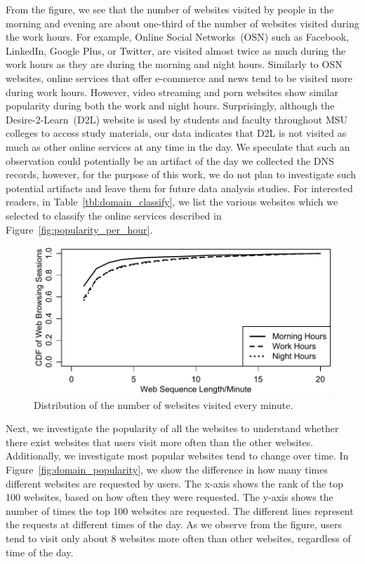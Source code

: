 \documentclass[letterpaper,twocolumn]{article}
\begin{document}


From the figure, we see that the number of websites visited by people in the morning and evening are about one-third of the number of websites visited during the work hours.
For example, Online Social Networks~(OSN) such as Facebook, LinkedIn, Google Plus, or Twitter, are visited almost twice as much during the work hours as they are during the morning and night hours.
Similarly to OSN websites, online services that offer e-commerce and news tend to be visited more during work hours.
However, video streaming and porn websites show similar popularity during both the work and night hours.
Surprisingly, although the Desire-2-Learn~(D2L) website is used by students and faculty throughout MSU colleges to access study materials, our data indicates that D2L is not visited as much as other online services at any time in the day.
We speculate that such an observation could potentially be an artifact of the day we collected the DNS records, however, for the purpose of this work, we do not plan to investigate such potential artifacts and leave them for future data analysis studies.
For interested readers, in Table~\ref{tbl:domain_classify}, we list the various websites which we selected to classify the online services described in Figure~\ref{fig:popularity_per_hour}.

 \begin{figure}[t]
\centering
\includegraphics[width=\linewidth]{img/sequence_length}
\vspace{-15pt}
\caption{Distribution of the number of websites visited every minute.}
 \label{fig:sequence_length}
  \endminipage
  \vspace{-23pt}
 \end{figure}

Next, we investigate the popularity of all the websites to understand whether there exist websites that users visit more often than the other websites. 
Additionally, we investigate most popular websites tend to change over time.
In Figure~\ref{fig:domain_popularity}, we show the difference in how many times different websites are requested by users.
The x-axis shows the rank of the top 100 websites, based on how often they were requested.
The y-axis shows the number of times the top 100 websites are requested.
The different lines represent the requests at different times of the day.
As we observe from the figure, users tend to visit only about 8 websites more often than other websites, regardless of time of the day.
\end{document}
